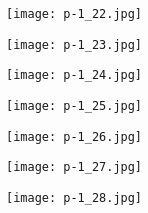 \clearpage


\begin{figure}
    \begin{center}
        \texttt{[image: p-1\_22.jpg]}
        \caption{}
    \end{center}
\end{figure}

\clearpage


\begin{figure}
    \begin{center}
        \texttt{[image: p-1\_23.jpg]}
        \caption{}
    \end{center}
\end{figure}

\clearpage


\begin{figure}
    \begin{center}
        \texttt{[image: p-1\_24.jpg]}
        \caption{}
    \end{center}
\end{figure}

\clearpage


\begin{figure}
    \begin{center}
        \texttt{[image: p-1\_25.jpg]}
        \caption{}
    \end{center}
\end{figure}

\clearpage


\begin{figure}
    \begin{center}
        \texttt{[image: p-1\_26.jpg]}
        \caption{}
    \end{center}
\end{figure}

\clearpage


\begin{figure}
    \begin{center}
        \texttt{[image: p-1\_27.jpg]}
        \caption{}
    \end{center}
\end{figure}

\clearpage


\begin{figure}
    \begin{center}
        \texttt{[image: p-1\_28.jpg]}
        \caption{}
    \end{center}
\end{figure}

